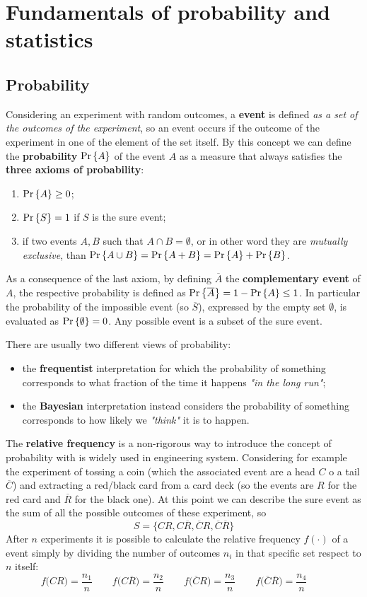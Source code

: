 \chapter{Fundamentals of probability and statistics}
\section*{Probability}
	Considering an experiment with random outcomes, a \textbf{event} is defined \textit{as a set of the outcomes of the experiment}, so an event occurs if the outcome of the experiment in one of the element of the set itself. By this concept we can define the \textbf{probability} $\textrm{Pr}\left\{ A \right\}$ of the event $A$ as a measure that always satisfies the \textbf{three axioms of probability}:
	\begin{enumerate}
		\item $\textrm{Pr}\left\{ A \right\} \geq 0$;
		\item $\textrm{Pr}\left\{ S \right\} = 1$  if $S$ is the sure event;
		\item if two events $A,B$ such that $A \cap B = \emptyset$, or in other word they are \textit{mutually exclusive}, than $\textrm{Pr}\left\{ A \cup B \right\} = \textrm{Pr}\left\{ A+B \right\} = \textrm{Pr}\left\{ A \right\} + \textrm{Pr}\left\{ B \right\}$.
	\end{enumerate} 

	As a consequence of the last axiom, by defining $\overline A$ the \textbf{complementary event} of $A$, the respective probability is defined as $\textrm{Pr}\left\{ \overline A \right\} = 1 - \textrm{Pr}\left\{ A \right\} \leq 1$. In particular the probability of the impossible event (so $\overline S$), expressed by the empty set $\emptyset$, is evaluated as $\textrm{Pr}\left\{ \emptyset \right\} = 0$. Any possible event is a subset of the sure event.
	
	There are usually two different views of probability:
	\begin{itemize}
		\item the \textbf{frequentist} interpretation for which the probability of something corresponds to what fraction of the time it happens \textit{"in the long run"};
		\item the \textbf{Bayesian} interpretation instead considers the probability of something corresponds to how likely we \textit{"think"} it is to happen.
	\end{itemize}
	The \textbf{relative frequency} is a non-rigorous way to introduce the concept of probability with is widely used in engineering system. Considering for example the experiment of tossing a coin (which the associated event are a head $C$ o a tail $\overline C$) and extracting a red/black card from a card deck (so the events are $R$ for the red card and $\overline R$ for the black one). At this point we can describe the sure event as the sum of all the possible outcomes of these experiment, so
	\[ S = \big\{ CR, C\overline R, \overline C R, \overline C \overline R \big\}\]
	After $n$ experiments it is possible to calculate the relative frequency $f(\cdot)$ of a event simply by dividing the number of outcomes $n_i$ in that specific set respect to $n$ itself:
	\[ f\big( CR \big) = \frac{n_1}{n} \qquad f\big( C \overline R \big) = \frac{n_2}{n} \qquad f\big( \overline CR \big) = \frac{n_3}{n} \qquad f\big( \overline C \overline R \big) = \frac{n_4}{n} \qquad  \] 
	
